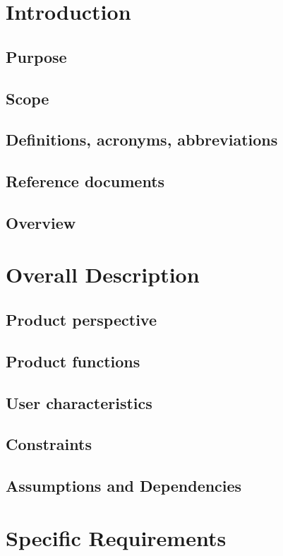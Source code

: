 
\section{Introduction}

  \subsection{Purpose}
  \subsection{Scope}
  \subsection{Definitions,  acronyms,  abbreviations}
  \subsection{Reference  documents}
  \subsection{Overview}
  
\section{Overall Description}

  \subsection{Product perspective}
  \subsection{Product functions}
  \subsection{User characteristics}
  \subsection{Constraints}
  \subsection{Assumptions  and  Dependencies}

\section{Specific Requirements}
